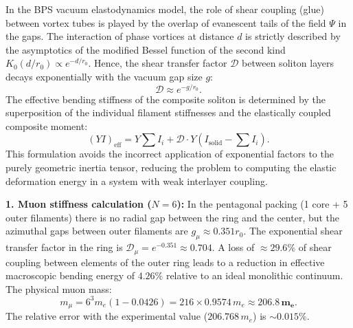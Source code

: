 \documentclass[11pt,a4paper]{article}
\begin{document}
In the BPS vacuum elastodynamics model, the role of shear coupling (glue) between vortex tubes is played by the overlap of evanescent tails of the field $\Psi$ in the gaps. The interaction of phase vortices at distance $d$ is strictly described by the asymptotics of the modified Bessel function of the second kind $K_0(d/r_0) \propto e^{-d/r_0}$. Hence, the shear transfer factor $\mathcal{D}$ between soliton layers decays exponentially with the vacuum gap size $g$:
\begin{equation}
\mathcal{D} \approx e^{-g/r_0}.
\end{equation}
The effective bending stiffness of the composite soliton is determined by the superposition of the individual filament stiffnesses and the elastically coupled composite moment:
\begin{equation}
(Y I)_{\text{eff}} = Y \sum I_i + \mathcal{D} \cdot Y \left( I_{\text{solid}} - \sum I_i \right).
\end{equation}
This formulation avoids the incorrect application of exponential factors to the purely geometric inertia tensor, reducing the problem to computing the elastic deformation energy in a system with weak interlayer coupling.

\textbf{1. Muon stiffness calculation ($N=6$):}
In the pentagonal packing (1 core + 5 outer filaments) there is no radial gap between the ring and the center, but the azimuthal gaps between outer filaments are $g_\mu \approx 0.351 r_0$. The exponential shear transfer factor in the ring is $\mathcal{D}_\mu = e^{-0.351} \approx 0.704$.
A loss of $\approx 29.6\%$ of shear coupling between elements of the outer ring leads to a reduction in effective macroscopic bending energy of $4.26\%$ relative to an ideal monolithic continuum. The physical muon mass:
\begin{equation}
m_\mu = 6^3 m_e (1 - 0.0426) = 216 \times 0.9574 \, m_e \approx \mathbf{206.8 \, m_e}.
\end{equation}
The relative error with the experimental value ($206.768 \, m_e$) is $\sim 0.015\%$.
\end{document}
